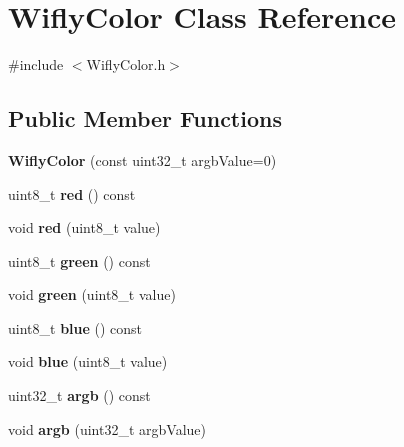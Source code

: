 \hypertarget{class_wifly_color}{\section{Wifly\-Color Class Reference}
\label{class_wifly_color}
}


{\ttfamily \#include $<$Wifly\-Color.\-h$>$}

\subsection*{Public Member Functions}
\begin{DoxyCompactItemize}
\item 
\hypertarget{class_wifly_color_a68d2fd89ce0c7d55514587c39f97e01c}{{\bfseries Wifly\-Color} (const uint32\-\_\-t argb\-Value=0)}\label{class_wifly_color_a68d2fd89ce0c7d55514587c39f97e01c}

\item 
\hypertarget{class_wifly_color_ad8523a03d716f35671c4e74f8940eb37}{uint8\-\_\-t {\bfseries red} () const }\label{class_wifly_color_ad8523a03d716f35671c4e74f8940eb37}

\item 
\hypertarget{class_wifly_color_a9397eca76be8f7abb88a84b719d99d6b}{void {\bfseries red} (uint8\-\_\-t value)}\label{class_wifly_color_a9397eca76be8f7abb88a84b719d99d6b}

\item 
\hypertarget{class_wifly_color_aeba066005ba425225621111ea6b9251f}{uint8\-\_\-t {\bfseries green} () const }\label{class_wifly_color_aeba066005ba425225621111ea6b9251f}

\item 
\hypertarget{class_wifly_color_abe50acffd7b1a172597ae8525149763a}{void {\bfseries green} (uint8\-\_\-t value)}\label{class_wifly_color_abe50acffd7b1a172597ae8525149763a}

\item 
\hypertarget{class_wifly_color_a9b2e0b29756d5915f4e96b85c1978fea}{uint8\-\_\-t {\bfseries blue} () const }\label{class_wifly_color_a9b2e0b29756d5915f4e96b85c1978fea}

\item 
\hypertarget{class_wifly_color_ad0c7f227f49eb00af032f4ae95e78f4a}{void {\bfseries blue} (uint8\-\_\-t value)}\label{class_wifly_color_ad0c7f227f49eb00af032f4ae95e78f4a}

\item 
\hypertarget{class_wifly_color_ac4034056a383f4e8c8beae0586459b8d}{uint32\-\_\-t {\bfseries argb} () const }\label{class_wifly_color_ac4034056a383f4e8c8beae0586459b8d}

\item 
\hypertarget{class_wifly_color_acfccad3c8a67c2e2f417beca040bc8df}{void {\bfseries argb} (uint32\-\_\-t argb\-Value)}\label{class_wifly_color_acfccad3c8a67c2e2f417beca040bc8df}

\end{DoxyCompactItemize}
